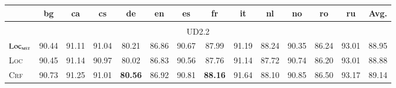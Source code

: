 \begin{table*}[tb]
    \setlength{\tabcolsep}{3.2pt}
    \centering
    \begin{tabular}{lccccccccccccc}
        \toprule
                                      & bg             & ca             & cs                               & de                              & en                              & es                               & fr                              & it                               & nl                               & no                              & ro                               & ru                               & Avg.                             \\[1pt]
        \hline
        \\[-9pt]
        \multicolumn{14}{c}{UD2.2}                                                                                                                                                                                                                                                                                                                                                                                                                                   \\[1pt]
        $\textsc{Loc}_{\textsc{mst}}$ & 90.44          & 91.11          & 91.04                            & 80.21                           & 86.86                           & 90.67                            & 87.99                           & 91.19                            & 88.24                            & 90.35                           & 86.24                            & 93.01                            & 88.95                            \\
        \textsc{Loc}                  & 90.45          & 91.14          & 90.97                            & 80.02                           & 86.83                           & 90.56                            & 87.76                           & 91.14                            & 87.72                            & 90.74                           & 86.20                            & 93.01                            & 88.88                            \\
        \textsc{Crf}                  & 90.73          & 91.25          & 91.01                            & \textbf{80.56}\rlap{$^\dagger$} & 86.92                           & 90.81\rlap{$^\dagger$}           & \textbf{88.16}                  & 91.64\rlap{$^\dagger$}           & 88.10                            & 90.85                           & 86.50                            & 93.17\rlap{$^\dagger$}           & 89.14\rlap{$^\ddagger$}          \\

\end{tabular}
\end{table*}
